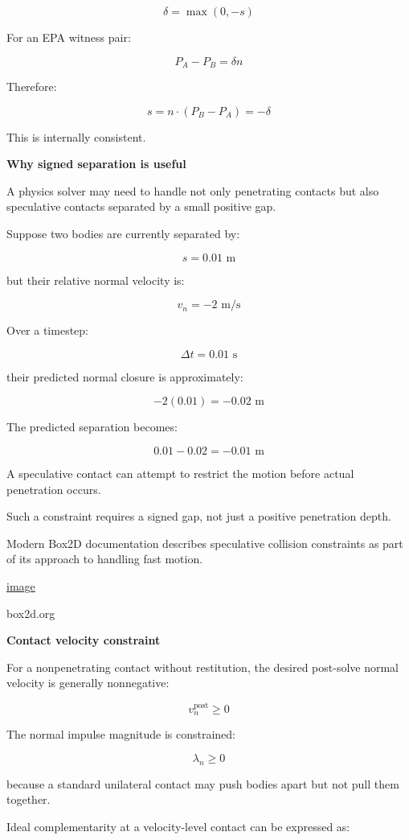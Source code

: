 \[
\boxed{ \delta=\max(0,-s) }
\]

For an EPA witness pair:

\[
P_A-P_B=\delta n
\]

Therefore:

\[
s=n\cdot(P_B-P_A)=-\delta
\]

This is internally consistent.

\textbf{Why signed separation is useful}

A physics solver may need to handle not only penetrating contacts but also speculative contacts separated by a small positive gap.

Suppose two bodies are currently separated by:

\[
s=0.01\text{ m}
\]

but their relative normal velocity is:

\[
v_n=-2\text{ m/s}
\]

Over a timestep:

\[
\Delta t=0.01\text{ s}
\]

their predicted normal closure is approximately:

\[
-2(0.01)=-0.02\text{ m}
\]

The predicted separation becomes:

\[
0.01-0.02=-0.01\text{ m}
\]

A speculative contact can attempt to restrict the motion before actual penetration occurs.

Such a constraint requires a signed gap, not just a positive penetration depth.

Modern Box2D documentation describes speculative collision constraints as part of its approach to handling fast motion. 

\href{https://www.google.com/s2/favicons?domain=https://box2d.org&sz=32}{image}

box2d.org

\textbf{Contact velocity constraint}

For a nonpenetrating contact without restitution, the desired post-solve normal velocity is generally nonnegative:

\[
\boxed{ v_n^{\mathrm{post}}\ge0 }
\]

The normal impulse magnitude is constrained:

\[
\boxed{ \lambda_n\ge0 }
\]

because a standard unilateral contact may push bodies apart but not pull them together.

Ideal complementarity at a velocity-level contact can be expressed as:

